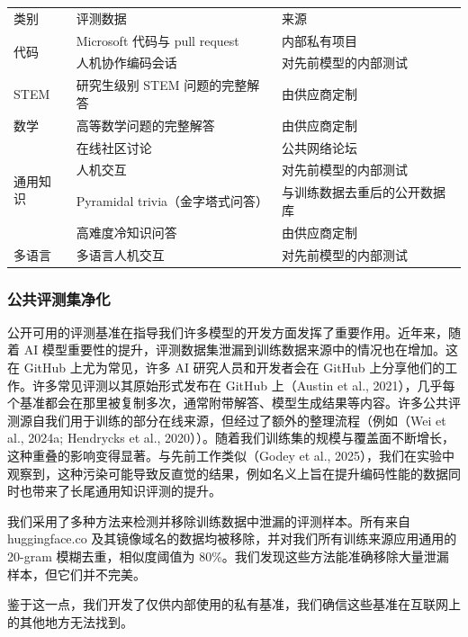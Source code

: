 \documentclass[
  10
]{article}
\newcounter{none} %
\begin{document}
{\def\LTcaptype{none} %
\begin{longtable}[]{@{}lll@{}}
\toprule\noalign{}
\endhead
\bottomrule\noalign{}
\endlastfoot
类别 & 评测数据 & 来源 \\
\multirow{2}{*}{代码} & Microsoft 代码与 pull request & 内部私有项目 \\
& 人机协作编码会话 & 对先前模型的内部测试 \\
STEM & 研究生级别 STEM 问题的完整解答 & 由供应商定制 \\
数学 & 高等数学问题的完整解答 & 由供应商定制 \\
\multirow{4}{*}{通用知识} & 在线社区讨论 & 公共网络论坛 \\
& 人机交互 & 对先前模型的内部测试 \\
& Pyramidal trivia（金字塔式问答） & 与训练数据去重后的公开数据库 \\
& 高难度冷知识问答 & 由供应商定制 \\
多语言 & 多语言人机交互 & 对先前模型的内部测试 \\
\end{longtable}
}

\subsubsection{公共评测集净化}\label{public-evaluation-decontamination}

公开可用的评测基准在指导我们许多模型的开发方面发挥了重要作用。近年来，随着 AI 模型重要性的提升，评测数据集泄漏到训练数据来源中的情况也在增加。这在 GitHub 上尤为常见，许多 AI 研究人员和开发者会在 GitHub 上分享他们的工作。许多常见评测以其原始形式发布在 GitHub 上（Austin et al., 2021），几乎每个基准都会在那里被复制多次，通常附带解答、模型生成结果等内容。许多公共评测源自我们用于训练的部分在线来源，但经过了额外的整理流程（例如（Wei et al., 2024a; Hendrycks et al., 2020））。随着我们训练集的规模与覆盖面不断增长，这种重叠的影响变得显著。与先前工作类似（Godey et al., 2025），我们在实验中观察到，这种污染可能导致反直觉的结果，例如名义上旨在提升编码性能的数据同时也带来了长尾通用知识评测的提升。

我们采用了多种方法来检测并移除训练数据中泄漏的评测样本。所有来自 huggingface.co 及其镜像域名的数据均被移除，并对我们所有训练来源应用通用的 20-gram 模糊去重，相似度阈值为 80\%。我们发现这些方法能准确移除大量泄漏样本，但它们并不完美。



鉴于这一点，我们开发了仅供内部使用的私有基准，我们确信这些基准在互联网上的其他地方无法找到。
\end{document}
